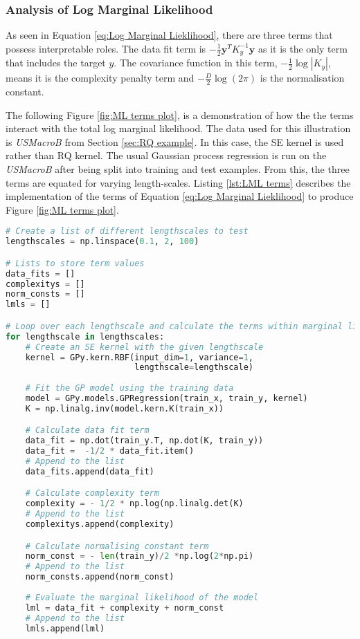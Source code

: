 \documentclass[12pt,a4paper]{article}
\begin{document}
\subsubsection{Analysis of Log Marginal Likelihood}

As seen in Equation \eqref{eq:Log Marginal Lieklihood}, there are three terms  that possess interpretable roles. The data fit term is \(- \frac{1}{2}\mathbf{y}^T K_y^{-1} \mathbf{y}\) as it is the only term that includes the target \(y\). The covariance function in this term, \(- \frac{1}{2} \log |K_y|\), means it is the complexity penalty term and \(-\frac{D}{2} \log(2\pi)\) is the normalisation constant.

The following Figure \ref{fig:ML terms plot}, is a demonstration of how the the terms interact with the total log marginal likelihood. The data used for this illustration is \textit{USMacroB} from Section \ref{sec:RQ example}. In this case, the SE kernel is used rather than RQ kernel. The usual Gaussian process regression is run on the \textit{USMacroB} after being split into training and test examples. From this, the three terms are equated for varying length-scales. Listing \ref{lst:LML terms} describes the implementation of the terms of Equation \eqref{eq:Log Marginal Lieklihood} to produce Figure \ref{fig:ML terms plot}.

\vspace{10pt}
\begin{lstlisting}[language=python, caption={Orginal Code of the the values of the three terms within Equation \eqref{eq:Log Marginal Lieklihood} with varying lengthscale.}, label={lst:LML terms}]
# Create a list of different lengthscales to test
lengthscales = np.linspace(0.1, 2, 100)  

# Lists to store term values
data_fits = []
complexitys = []
norm_consts = []
lmls = []

# Loop over each lengthscale and calculate the terms within marginal likelihood
for lengthscale in lengthscales:
    # Create an SE kernel with the given lengthscale
    kernel = GPy.kern.RBF(input_dim=1, variance=1,
                          lengthscale=lengthscale)
    
    # Fit the GP model using the training data
    model = GPy.models.GPRegression(train_x, train_y, kernel)
    K = np.linalg.inv(model.kern.K(train_x))

    # Calculate data fit term
    data_fit = np.dot(train_y.T, np.dot(K, train_y))
    data_fit =  -1/2 * data_fit.item()
    # Append to the list
    data_fits.append(data_fit)

    # Calculate complexity term
    complexity = - 1/2 * np.log(np.linalg.det(K)
    # Append to the list
    complexitys.append(complexity)

    # Calculate normalising constant term
    norm_const = - len(train_y)/2 *np.log(2*np.pi) 
    # Append to the list
    norm_consts.append(norm_const)
    
    # Evaluate the marginal likelihood of the model
    lml = data_fit + complexity + norm_const
    # Append to the list
    lmls.append(lml)
\end{lstlisting}
\end{document}
